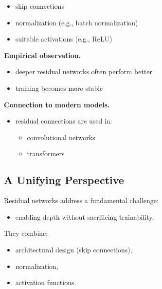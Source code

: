 \begin{itemize}
    \item skip connections
    \item normalization (e.g., batch normalization)
    \item suitable activations (e.g., ReLU)
\end{itemize}

\medskip

\noindent
\textbf{Empirical observation.}

\begin{itemize}
    \item deeper residual networks often perform better
    \item training becomes more stable
\end{itemize}

\medskip

\noindent
\textbf{Connection to modern models.}

\begin{itemize}
    \item residual connections are used in:
    \begin{itemize}
        \item convolutional networks
        \item transformers
    \end{itemize}
\end{itemize}

\subsection{A Unifying Perspective}

Residual networks address a fundamental challenge:

\begin{itemize}
    \item enabling depth without sacrificing trainability.
\end{itemize}

\medskip

\noindent
They combine:

\begin{itemize}
    \item architectural design (skip connections),
    \item normalization,
    \item activation functions.
\end{itemize}

\medskip


